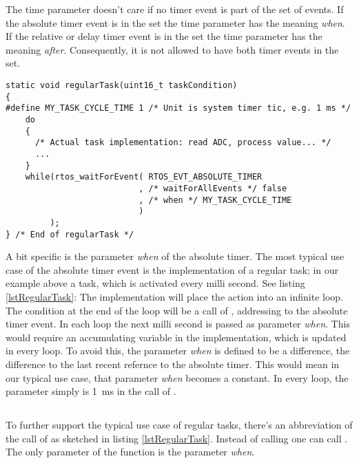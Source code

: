 The time parameter doesn't care if no timer event is part of the set of
events. If the absolute timer event is in the set the time parameter has
the meaning \emph{when}. If the relative or delay timer event is in the
set the time parameter has the meaning \emph{after}. Consequently, it is
not allowed to have both timer events in the set.

\begin{lstlisting}[float, caption=Typical use case: regular task,
label=lstRegularTask, captionpos=b]
static void regularTask(uint16_t taskCondition)
{
#define MY_TASK_CYCLE_TIME 1 /* Unit is system timer tic, e.g. 1 ms */
    do
    {
      /* Actual task implementation: read ADC, process value... */
      ...
    }
    while(rtos_waitForEvent( RTOS_EVT_ABSOLUTE_TIMER
                           , /* waitForAllEvents */ false
                           , /* when */ MY_TASK_CYCLE_TIME
                           )
         );
} /* End of regularTask */
\end{lstlisting}

A bit specific is the parameter \emph{when} of the absolute timer. The
most typical use case of the absolute timer event is the implementation of
a regular task; in our example above a task, which is activated every
milli second. See listing \ref{lstRegularTask}: The implementation will
place the action into an infinite loop. The  condition at the
end of the loop will be a call of , addressing
to the absolute timer event. In each loop the next milli second is passed
as parameter \emph{when}. This would require an accumulating variable in
the implementation, which is updated in every loop. To avoid this, the
parameter \emph{when} is defined to be a difference, the difference to the
last recent refernce to the absolute timer. This would mean in our typical
use case, that parameter \emph{when} becomes a constant. In every loop,
the parameter simply is 1~ms in the call of .


\subsection{}

To further support the typical use case of regular tasks, there's an
abbreviation of the call of  as sketched in
listing \ref{lstRegularTask}. Instead of calling
 one can call .
The only parameter of the function is the parameter \emph{when}.

